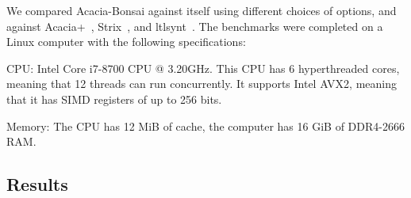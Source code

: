 \documentclass[runningheads,a4paper]{llncs}
\begin{document}
We compared Acacia-Bonsai against itself using different choices of options, and
against Acacia+~\cite{bbfjr12}, Strix~\cite{msl18}, and
ltlsynt~\cite{duret.16.atva2}.  The benchmarks were completed on a
Linux computer with the following specifications:
\begin{compactitem}
\item CPU: Intel\textregistered{} Core\texttrademark{} i7-8700 CPU @ 3.20GHz.  This CPU
  has 6 hyperthreaded cores, meaning that 12 threads can run concurrently.  It
  supports Intel\textregistered{} AVX2, meaning that it has SIMD registers of up to
  256 bits.
\item Memory: The CPU has 12 MiB of cache, the computer has 16 GiB of DDR4-2666
  RAM.
\end{compactitem}

\subsection{Results}
\end{document}
